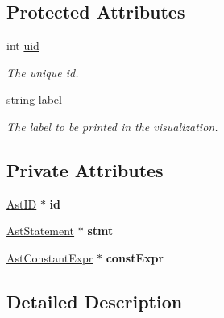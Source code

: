 \subsection*{Protected Attributes}
\begin{DoxyCompactItemize}
\item 
\hypertarget{classAST_a847b778f1c3dd5a19de32de432ee6e15}{int \hyperlink{classAST_a847b778f1c3dd5a19de32de432ee6e15}{uid}}\label{classAST_a847b778f1c3dd5a19de32de432ee6e15}

\begin{DoxyCompactList}\small\item\em The unique id. \end{DoxyCompactList}\item 
\hypertarget{classAST_ab2e239ccc0688d2341724432ff5a1a31}{string \hyperlink{classAST_ab2e239ccc0688d2341724432ff5a1a31}{label}}\label{classAST_ab2e239ccc0688d2341724432ff5a1a31}

\begin{DoxyCompactList}\small\item\em The label to be printed in the visualization. \end{DoxyCompactList}\end{DoxyCompactItemize}
\subsection*{Private Attributes}
\begin{DoxyCompactItemize}
\item 
\hypertarget{classAstLabeledStmt_a121dfefb3b1b463a508d338e98691f4f}{\hyperlink{classAstID}{Ast\-I\-D} $\ast$ {\bfseries id}}\label{classAstLabeledStmt_a121dfefb3b1b463a508d338e98691f4f}

\item 
\hypertarget{classAstLabeledStmt_ac146d1e573fb5423c9968b5150334f7c}{\hyperlink{classAstStatement}{Ast\-Statement} $\ast$ {\bfseries stmt}}\label{classAstLabeledStmt_ac146d1e573fb5423c9968b5150334f7c}

\item 
\hypertarget{classAstLabeledStmt_a6d67cf697a1beb6dd78946fc0c37a379}{\hyperlink{classAstConstantExpr}{Ast\-Constant\-Expr} $\ast$ {\bfseries const\-Expr}}\label{classAstLabeledStmt_a6d67cf697a1beb6dd78946fc0c37a379}

\end{DoxyCompactItemize}


\subsection{Detailed Description}


